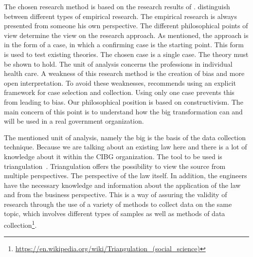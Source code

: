 The chosen research method is based on the research results of \cite{Easterbrook}.
\cite{Easterbrook} distinguish between different types of empirical research. 
The empirical research is always presented from someone his own perspective. 
The different philosophical points of view determine the view on the research approach. 
As mentioned, the approach is in the form of a case, in which a confirming case is the starting point. 
This form is used to test existing theories. 
The chosen case is a single case. 
The theory must be shown to hold. 
The unit of analysis concerns the professions in individual health care. 
A weakness of this research method is the creation of bias and more open interpretation.
To avoid these weaknesses, \cite{Easterbrook} recommends using an explicit framework for case selection and collection.
Using only one case prevents this from leading to bias.
Our philosophical position is based on constructivism.
The main concern of this point is to understand how the \acrfull{big} transformation can and will be used in a real government organization.

The mentioned unit of analysis, namely the \acrfull{big} is the basis of the data collection technique.
Because we are talking about an existing law here and there is a lot of knowledge about it within the CIBG organization.
The tool to be used is triangulation~\citep{carter_use_2014, farquhar_triangulation_2020, runeson_guidelines_2008}.
Triangulation offers the possibility to view the source from multiple perspectives.
The perspective of the law itself.
In addition, the engineers have the necessary knowledge and information about the application of the law and from the business perspective.
This is a way of assuring the validity of research through the use of a variety of methods to collect data on the same topic, which involves different types of samples as well as methods of data collection\footnote{\url{https://en.wikipedia.org/wiki/Triangulation_(social_science)}}.




